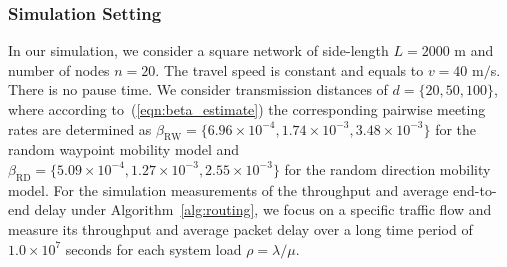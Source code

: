 \documentclass[twocolumn, 10pt]{svjour3}         \smartqed  \usepackage{graphicx}
\begin{document}
\subsubsection{Simulation Setting}
In our simulation, we consider a square network  of side-length $L = 2000$ m and  number of nodes $n = 20$.
The travel speed is constant and equals to $v = 40$ m$/$s.
There is no pause time.
We consider transmission distances of $ d = \{20,50,100\}$, where according to~(\ref{eqn:beta_estimate}) the corresponding pairwise meeting rates are determined as $\beta_\text{RW} = \{6.96 \times 10^{-4},1.74\times 10^{-3}, 3.48 \times 10^{-3} \}$ for the random waypoint mobility model and $\beta_\text{RD} = \{5.09 \times 10^{-4},1.27\times 10^{-3}, 2.55 \times 10^{-3} \}$ for the random direction mobility model. 
For the simulation measurements of the throughput and average end-to-end delay under Algorithm~\ref{alg:routing}, we focus on a specific traffic flow and measure its throughput and average packet delay over a long time period
of $1.0 \times 10^7$ seconds for each system load $\rho = \lambda / \mu$.
\end{document}
